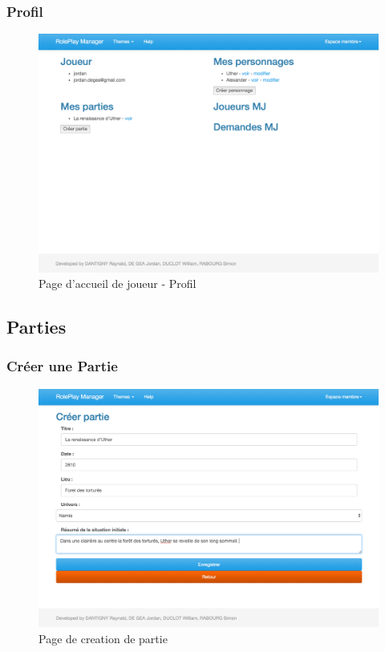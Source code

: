 \documentclass[a4paper,oneside,10pt]{article}
\begin{document}
\subsubsection{Profil}
\label{MUProfil}
\begin{figure}[H]
	\begin{center}
		\includegraphics[width=\textwidth]{images/manuel/profil.png}  
		\caption{Page d'accueil de joueur - Profil}
	\end{center}
\end{figure}


\subsection{Parties}

\subsubsection{Créer une Partie}
\label{MUCreerPartie}
\begin{figure}[H]
	\begin{center}
		\includegraphics[width=\textwidth]{images/manuel/creerpartie.png}  
		\caption{Page de creation de partie}
	\end{center}
\end{figure}
\end{document}
